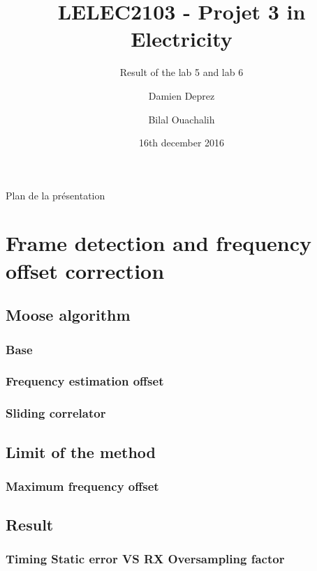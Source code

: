 \documentclass[11pt]{beamer}
\title{LELEC2103 - Projet 3 in Electricity}
\subtitle[\ldots]{Result of the lab 5 and lab 6}
\author[D. Deprez\and B. Ouachalih]{Damien Deprez\and Bilal Ouachalih}
\institute{EPL}
\date{16th december 2016}
\begin{document}
{
	\begin{frame}[noframenumbering]
		\titlepage
	\end{frame}
} 

{
	\begin{frame}[noframenumbering]{Plan de la présentation}
		\tableofcontents
	\end{frame}
}

\section{Frame detection and frequency offset correction}

\subsection{Moose algorithm}

\begin{frame}
\frametitle{Base}


\end{frame}


\subsubsection{Frequency estimation offset}
\begin{frame}
\frametitle{Sliding correlator}


\end{frame}

\subsection{Limit of the method}

\begin{frame}
\frametitle{Maximum frequency offset}


\end{frame}

\subsection{Result}
\subsubsection{}
\begin{frame}
\frametitle{Timing Static error VS RX Oversampling factor}

\end{frame}
\end{document}
